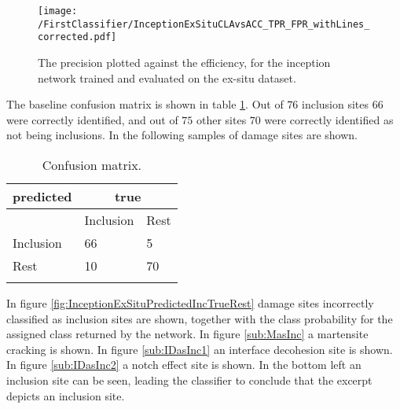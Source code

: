 \begin{figure}[H]
\texttt{[image: /FirstClassifier/InceptionExSituCLAvsACC\_TPR\_FPR\_withLines\_corrected.pdf]}
\caption{The precision plotted against the efficiency, for the inception network trained and evaluated on the ex-situ dataset.}
\label{fig:InceptionExSituCLAvsACC}
\end{figure}

The baseline confusion matrix is shown in table \ref{tab:FirstClassifierConfusionMatrixExSitu}. Out of $76$ inclusion sites $66$ were correctly identified, and out of $75$ other sites $70$ were correctly identified as not being inclusions. In the following samples of damage sites are shown.

\begin{table}
 \begin{center}
  \begin{tabular}{@{} *3l @{}} \toprule[2pt]
   predicted &  \multicolumn{2}{c}{true}  \\\midrule
    & Inclusion  & Rest   \\ 
   Inclusion  & 66 & 5 \\ 
   Rest  & 10 & 70 \\ \bottomrule[2pt]
   \label{tab:FirstClassifierConfusionMatrixExSitu}
  \end{tabular}
 \end{center}
 \caption{Confusion matrix.}
\end{table}

In figure \ref{fig:InceptionExSituPredictedIncTrueRest} damage sites incorrectly classified as inclusion sites are shown, together with the class probability for the assigned class returned by the network. In figure \ref{sub:MasInc} a martensite cracking is shown. In figure \ref{sub:IDasInc1} an interface decohesion site is shown. In figure \ref{sub:IDasInc2} a notch effect site is shown. In the bottom left an inclusion site can be seen, leading the classifier to conclude that the excerpt depicts an inclusion site. 



